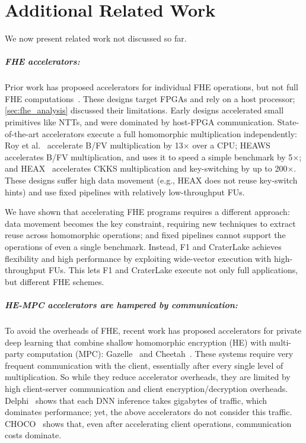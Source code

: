 \chapter{Additional Related Work}\label{sec:related}

We now present related work not discussed so far.

\paragraph{FHE accelerators:}
Prior work has proposed accelerators for individual FHE operations, but not
full FHE
computations~\cite{cousins:hpec12:sipher-fpga,cousins:hpec14:fpga-he,cousins:tetc17:fpga-he,doroz:tc15:accelerating-fhe,roy:hpca19:fpga-he,mert:tvlsi20:bfv-accel,migliore:tecs17:he-karatsuba,riazi:asplos20:heax,turan:tc20:heaws}.
These designs target FPGAs and rely on a host processor;
\autoref{sec:fhe_analysis} discussed their limitations. Early designs
accelerated small primitives like NTTs, and were dominated by host-FPGA
communication. State-of-the-art accelerators execute a full homomorphic
multiplication independently: Roy et al.~\cite{roy:hpca19:fpga-he} accelerate
B/FV multiplication by 13$\times$ over a CPU;
HEAWS~\cite{turan:tc20:heaws} accelerates B/FV multiplication, and uses it to
speed a simple benchmark by 5$\times$; and HEAX~\cite{riazi:asplos20:heax}
accelerates CKKS multiplication and key-switching by up to 200$\times$. These
designs suffer high data movement (e.g., HEAX does not reuse key-switch hints)
and use fixed pipelines with relatively low-throughput FUs.

We have shown that accelerating FHE programs requires a different approach:
data movement becomes the key constraint, requiring new techniques
to extract reuse {across} homomorphic operations;
and fixed pipelines cannot support the operations of even a single benchmark.
Instead, F1 and CraterLake achieves flexibility and high performance by exploiting
wide-vector execution with high-throughput FUs.
This lets F1 and CraterLake execute not only full applications, but different FHE schemes.


\paragraph{HE-MPC accelerators are hampered by communication:}
To avoid the overheads of FHE, recent work has proposed accelerators for
private deep learning that combine shallow homomorphic encryption (HE) with
multi-party computation (MPC): Gazelle~\cite{juvekar2018gazelle} and
Cheetah~\cite{reagen:hpca21:cheetah}. These systems require very frequent
communication with the client, essentially after every single level of
multiplication. So while they reduce accelerator overheads, they are limited by
high client-server communication and client encryption/decryption overheads.
Delphi~\cite{mishra2020delphi} shows that each DNN inference takes gigabytes of
traffic, which dominates performance; yet, the above accelerators do not
consider this traffic. CHOCO~\cite{vanderhagen:arxiv21:choco} shows that, even
after accelerating client operations, communication costs dominate.

